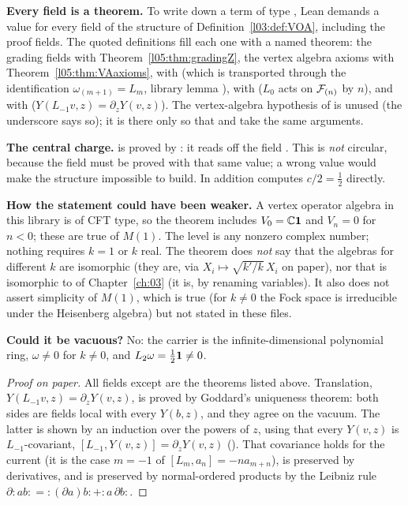 \begin{dictionary}
\textbf{Every field is a theorem.} To write down a term of type , Lean demands
a value for every field of the structure of Definition~\ref{l03:def:VOA}, including the proof fields. The
quoted definitions fill each one with a named theorem: the grading fields with
Theorem~\ref{l05:thm:gradingZ}, the vertex algebra axioms with Theorem~\ref{l05:thm:VAaxioms}, 
with  (which is  transported through the identification
$\omega_{(m+1)}=L_m$, library lemma ),  with
 ($L_0$ acts on $\mathcal{F}_{(n)}$ by $n$), and  with
 ($Y(L_{-1}v,z)=\partial_zY(v,z)$). The vertex-algebra hypothesis  of
 is unused (the underscore says so); it is there only so that  and
 take the same arguments.

\textbf{The central charge.}  is proved by : it reads off the field
. This is \emph{not} circular, because the field  must be proved with
that same value; a wrong value would make the structure impossible to build. In addition
 computes $c/2=\frac12$ directly.

\textbf{How the statement could have been weaker.} A vertex operator algebra in this library is of CFT
type, so the theorem includes $V_0={\mathbb{C}}\mathbf{1}$ and $V_n=0$ for $n<0$; these are true of $M(1)$. The level is
any nonzero complex number; nothing requires $k=1$ or $k$ real. The theorem does \emph{not} say that the
algebras for different $k$ are isomorphic (they are, via $X_i\mapsto\sqrt{k'/k}\,X_i$ on paper), nor that
 is isomorphic to  of Chapter~\ref{ch:03} (it is, by
renaming variables). It also does not assert simplicity of $M(1)$, which is true (for $k\ne0$ the Fock space
is irreducible under the Heisenberg algebra) but not stated in these files.

\textbf{Could it be vacuous?} No: the carrier is the infinite-dimensional polynomial ring, $\omega\neq0$ for
$k\ne0$, and $L_2\omega=\frac12\mathbf{1}\ne0$.
\end{dictionary}

\begin{proof}[Proof on paper]
All fields except  are the theorems listed above. Translation, $Y(L_{-1}v,z)=\partial_zY(v,z)$, is
proved by Goddard's uniqueness theorem: both sides are fields local with every $Y(b,z)$, and they agree on the
vacuum. The latter is shown by an induction over the powers of $z$, using that every $Y(v,z)$ is
$L_{-1}$-covariant, $[L_{-1},Y(v,z)]=\partial_zY(v,z)$ (). That covariance holds for the
current (it is the case $m=-1$ of $[L_m,a_n]=-na_{m+n}$), is preserved by derivatives, and is preserved by
normal-ordered products by the Leibniz rule $\partial{:}ab{:}={:}(\partial a)b{:}+{:}a\,\partial b{:}$.
\end{proof}

